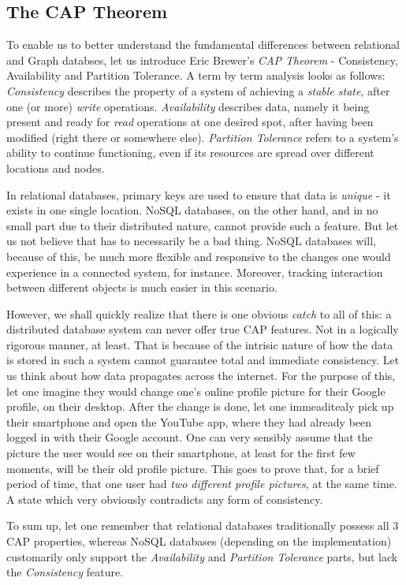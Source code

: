\documentclass[10pt,        %
               a4paper,     %
               journal,     %
               ]{IEEEtran}
\begin{document}
\subsection{The CAP Theorem}
To enable us to better understand the fundamental differences between relational and Graph databses, let us introduce Eric Brewer's \textit{CAP Theorem} - Consistency, Availability and Partition Tolerance. \cite{brewer_cap_theorem} A term by term analysis looks as follows: \textit{Consistency} describes the property of a system of achieving a \textit{stable state}, after one (or more) \textit{write} operations. \textit{Availability} describes data, namely it being present and ready for \textit{read} operations at one desired spot, after having been modified (right there or somewhere else). \textit{Partition Tolerance} refers to a system's ability to continue functioning, even if its resources are spread over different locations and nodes. \par
In relational databases, primary keys are used to ensure that data is \textit{unique} - it exists in one single location. NoSQL databases, on the other hand, and in no small part due to their distributed nature, cannot provide such a feature. But let us not believe that has to necessarily be a bad thing. NoSQL databases will, because of this, be much more flexible and responsive to the changes one would experience in a connected system, for instance. Moreover, tracking interaction between different objects is much easier in this scenario. \par
However, we shall quickly realize that there is one obvious \textit{catch} to all of this: a distributed database system can never offer true CAP features. Not in a logically rigorous manner, at least. That is because of the intrisic nature of how the data is stored in such a system cannot guarantee total and immediate consistency. Let us think about how data propagates across the internet. For the purpose of this, let one imagine they would change one's online profile picture for their Google profile, on their desktop. After the change is done, let one immeaditealy pick up their smartphone and open the YouTube app, where they had already been logged in with their Google account. One can very sensibly assume that the picture the user would see on their smartphone, at least for the first few moments, will be their old profile picture. This goes to prove that, for a brief period of time, that one user had \textit{two different profile pictures}, at the same time. A state which very obviously contradicts any form of consistency. \par
To sum up, let one remember that relational databases traditionally possess all 3 CAP properties, whereas NoSQL databases (depending on the implementation) customarily only support the \textit{Availability} and \textit{Partition Tolerance} parts, but lack the \textit{Consistency} feature.\par
\end{document}
